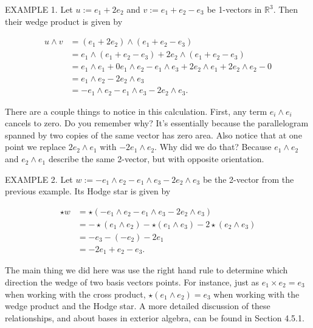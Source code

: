 \documentclass[10pt]{article}
\begin{document}
EXAMPLE 1. Let $u:=e_{1}+2 e_{2}$ and $v:=e_{1}+e_{2}-e_{3}$ be 1-vectors in $\mathbb{R}^{3}$. Then their wedge product is given by

$$
\begin{aligned}
u \wedge v & =\left(e_{1}+2 e_{2}\right) \wedge\left(e_{1}+e_{2}-e_{3}\right) \\
& =e_{1} \wedge\left(e_{1}+e_{2}-e_{3}\right)+2 e_{2} \wedge\left(e_{1}+e_{2}-e_{3}\right) \\
& =e_{1} \wedge e_{1}+0 e_{1} \wedge e_{2}-e_{1} \wedge e_{3}+2 e_{2} \wedge e_{1}+2 e_{2} \wedge e_{2}-0 \\
& =e_{1} \wedge e_{2}-2 e_{2} \wedge e_{3} \\
& =-e_{1} \wedge e_{2}-e_{1} \wedge e_{3}-2 e_{2} \wedge e_{3} .
\end{aligned}
$$

There are a couple things to notice in this calculation. First, any term $e_{i} \wedge e_{i}$ cancels to zero. Do you remember why? It's essentially because the parallelogram spanned by two copies of the same vector has zero area. Also notice that at one point we replace $2 e_{2} \wedge e_{1}$ with $-2 e_{1} \wedge e_{2}$. Why did we do that? Because $e_{1} \wedge e_{2}$ and $e_{2} \wedge e_{1}$ describe the same 2-vector, but with opposite orientation.

EXAMPLE 2. Let $w:=-e_{1} \wedge e_{2}-e_{1} \wedge e_{3}-2 e_{2} \wedge e_{3}$ be the 2-vector from the previous example. Its Hodge star is given by

$$
\begin{aligned}
\star w & =\star\left(-e_{1} \wedge e_{2}-e_{1} \wedge e_{3}-2 e_{2} \wedge e_{3}\right) \\
& =-\star\left(e_{1} \wedge e_{2}\right)-\star\left(e_{1} \wedge e_{3}\right)-2 \star\left(e_{2} \wedge e_{3}\right) \\
& =-e_{3}-\left(-e_{2}\right)-2 e_{1} \\
& =-2 e_{1}+e_{2}-e_{3} .
\end{aligned}
$$

The main thing we did here was use the right hand rule to determine which direction the wedge of two basis vectors points. For instance, just as $e_{1} \times e_{2}=e_{3}$ when working with the cross product, $\star\left(e_{1} \wedge e_{2}\right)=e_{3}$ when working with the wedge product and the Hodge star. A more detailed discussion of these relationships, and about bases in exterior algebra, can be found in Section 4.5.1.
\end{document}
